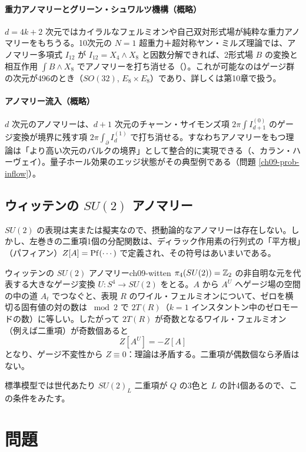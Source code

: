 \paragraph{重力アノマリーとグリーン・シュワルツ機構（概略）}
$d=4k+2$ 次元ではカイラルなフェルミオンや自己双対形式場が純粋な重力アノマリーをもちうる。10次元の $N=1$ 超重力＋超対称ヤン・ミルズ理論では、アノマリー多項式 $I_{12}$ が $I_{12}=X_4\wedge X_8$ と因数分解できれば、2形式場 $B$ の変換と相互作用 $\int B\wedge X_8$ でアノマリーを打ち消せる（）。これが可能なのはゲージ群の次元が496のとき（$SO(32)$, $E_8\times E_8$）であり、詳しくは第10章で扱う。

\paragraph{アノマリー流入（概略）}
$d$ 次元のアノマリーは、$d+1$ 次元のチャーン・サイモンズ項 $2\pi\int I^{(0)}_{d+1}$ のゲージ変換が境界に残す項 $2\pi\int_{\partial}I^{(1)}_d$ で打ち消せる。すなわちアノマリーをもつ理論は「より高い次元のバルクの境界」として整合的に実現できる（、カラン・ハーヴェイ）。量子ホール効果のエッジ状態がその典型例である（問題 \ref{ch09-prob-inflow}）。

\subsection{ウィッテンの $SU(2)$ アノマリー}
$SU(2)$ の表現は実または擬実なので、摂動論的なアノマリーは存在しない。しかし、左巻きの二重項1個の分配関数は、ディラック作用素の行列式の「平方根」（パフィアン）$Z[A]=\operatorname{Pf}(\cdots)$ で定義され、その符号はあいまいである。

\begin{mythm}{ウィッテンの $SU(2)$ アノマリー}{ch09-witten}
$\pi_4(SU(2))=\mathbb{Z}_2$ の非自明な元を代表する大きなゲージ変換 $U\colon S^4\to SU(2)$ をとる。$A$ から $A^U$ へゲージ場の空間の中の道 $A_t$ でつなぐと、表現 $R$ のワイル・フェルミオンについて、ゼロを横切る固有値の対の数は $\bmod 2$ で $2T(R)$（$k=1$ インスタントン中のゼロモードの数）に等しい。したがって $2T(R)$ が奇数となるワイル・フェルミオン（例えば二重項）が奇数個あると
\[
Z[A^U]=-Z[A]
\]
となり、ゲージ不変性から $Z\equiv0$：理論は矛盾する。二重項が偶数個なら矛盾はない。
\end{mythm}
標準模型では世代あたり $SU(2)_L$ 二重項が $Q$ の3色と $L$ の計4個あるので、この条件をみたす。

\section{問題}

